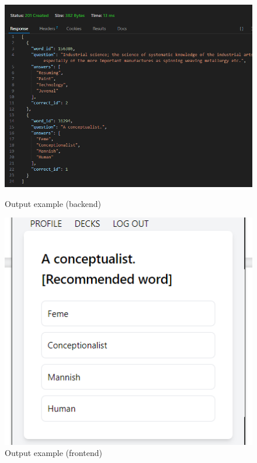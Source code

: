 \documentclass{article}
\begin{document}
\begin{figure}[h!]
    \centering

    \begin{minipage}{0.45\textwidth}
        \centering
        \includegraphics[width=\textwidth]{output-backend.png}
        \caption{Output example (backend)}
        \label{fig:enter-label}
    \end{minipage}
    \begin{minipage}{0.45\textwidth}
        \centering
        \includegraphics[width=\textwidth]{output-frontend.png}
        \caption{Output example (frontend)}
        \label{fig:enter-label}
    \end{minipage}
\end{figure}
\end{document}
